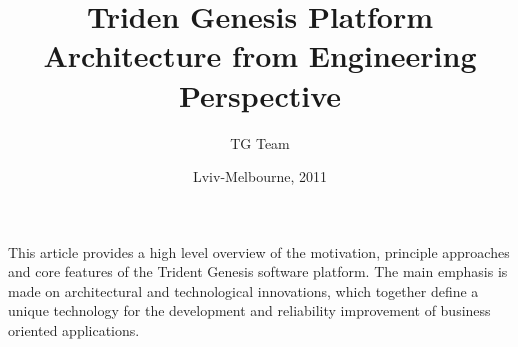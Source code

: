 \begin{titlepage}
\title{Triden Genesis Platform Architecture from Engineering Perspective}
\author{TG Team}
\date{Lviv-Melbourne, 2011}
\maketitle
\clearpage
  This article provides a high level overview of the motivation, principle approaches and core features of the Trident Genesis software platform.
  The main emphasis is made on architectural and technological innovations, which together define a unique technology for the development and reliability improvement of business oriented applications.

\clearpage
\tableofcontents
\clearpage

\end{titlepage}